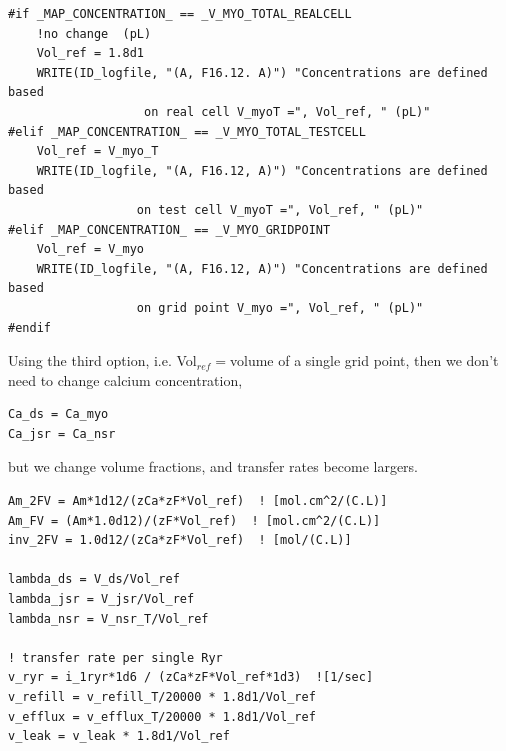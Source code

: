 \begin{verbatim}
#if _MAP_CONCENTRATION_ == _V_MYO_TOTAL_REALCELL
    !no change  (pL)
    Vol_ref = 1.8d1
    WRITE(ID_logfile, "(A, F16.12. A)") "Concentrations are defined based 
                   on real cell V_myoT =", Vol_ref, " (pL)"
#elif _MAP_CONCENTRATION_ == _V_MYO_TOTAL_TESTCELL
    Vol_ref = V_myo_T
    WRITE(ID_logfile, "(A, F16.12, A)") "Concentrations are defined based 
                  on test cell V_myoT =", Vol_ref, " (pL)"
#elif _MAP_CONCENTRATION_ == _V_MYO_GRIDPOINT
    Vol_ref = V_myo
    WRITE(ID_logfile, "(A, F16.12, A)") "Concentrations are defined based 
                  on grid point V_myo =", Vol_ref, " (pL)"
#endif    
\end{verbatim}
% 

Using the third option, i.e. Vol$_{ref}=$volume of a single grid point, then we
don't need to change calcium concentration, 
\begin{lstlisting}
Ca_ds = Ca_myo
Ca_jsr = Ca_nsr
\end{lstlisting}
but we change volume fractions, and
transfer rates become largers.
\begin{verbatim}
Am_2FV = Am*1d12/(zCa*zF*Vol_ref)  ! [mol.cm^2/(C.L)]
Am_FV = (Am*1.0d12)/(zF*Vol_ref)  ! [mol.cm^2/(C.L)]
inv_2FV = 1.0d12/(zCa*zF*Vol_ref)  ! [mol/(C.L)]

lambda_ds = V_ds/Vol_ref
lambda_jsr = V_jsr/Vol_ref
lambda_nsr = V_nsr_T/Vol_ref

! transfer rate per single Ryr 
v_ryr = i_1ryr*1d6 / (zCa*zF*Vol_ref*1d3)  ![1/sec]
v_refill = v_refill_T/20000 * 1.8d1/Vol_ref
v_efflux = v_efflux_T/20000 * 1.8d1/Vol_ref
v_leak = v_leak * 1.8d1/Vol_ref
\end{verbatim}

%     


